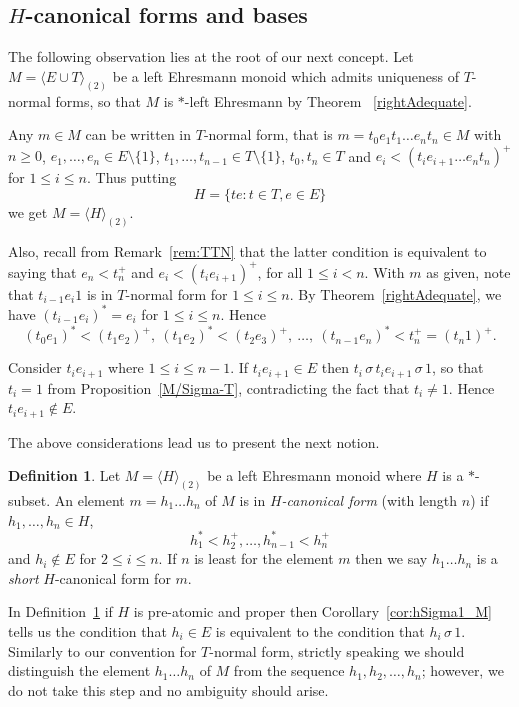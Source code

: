 \documentclass[12pt]{amsart}
\theoremstyle{definition}
\newtheorem{defn}[them]{Definition}
\theoremstyle{definition}
\numberwithin{them}{section}
\numberwithin{equation}{section}
\begin{document}
\subsection{$H$-canonical forms  and bases}\label{sub:h-simple}
The following observation lies at the root of our next concept.
Let $M = \langle E \cup T \rangle_{(2)}$  be a left Ehresmann monoid which admits uniqueness of $T$-normal forms, so that $M$ is $*$-left Ehresmann by Theorem ~\ref{rightAdequate}.
 
 Any $m \in M$ can be written in $T$-normal form, that is $m=t_0e_1t_1\dots e_nt_n\in M$ with $n \geq 0$, $e_1, \dots, e_n \in E\setminus \{1\}$, $t_1, \dots, t_{n-1} \in T\setminus \{1\}$, $t_0, t_n \in T$ and $e_i<(t_ie_{i+1}\dots e_nt_n)^{+}$ for $1 \leq i \leq n$. Thus putting
\[H=\{te: t \in T, e \in E\}\]
we get $M=\langle H\rangle_{(2)}$.

Also, recall from Remark~\ref{rem:TTN} that the latter condition is equivalent to saying that $e_n<t_n^+$ and   $e_i < (t_ie_{i+1})^+$, for all $1 \leq i < n$. With $m$ as given, note that  $t_{i-1}e_i1$ is in   $T$-normal form for $1\leq i\leq n$. By Theorem~\ref{rightAdequate}, we have
$(t_{i-1}e_i)^* = e_i$ for $1\leq i\leq n$.
Hence 
\[(t_0e_1)^* < (t_1e_2)^+,\ (t_1e_2)^* < (t_2e_3)^+,\ \dots,\ (t_{n-1}e_n)^* < t_n^+ = (t_n1)^+.\]

 Consider $t_ie_{i+1}$ where $1 \leq i \leq n-1$. If $t_ie_{i+1}\in E$ then $t_i\,\sigma \, t_ie_{i+1}\, \sigma\,  1$, so that $t_i=1$ from Proposition~\ref {M/Sigma-T}, contradicting the fact that $t_i\neq 1$. Hence $t_ie_{i+1}\notin E$.


The above considerations lead us to present the  next notion.



\begin{defn}\label{defn:hnormal}  Let $M=\langle H\rangle_{(2)}$  be a left Ehresmann monoid  where  $H$ is a $*$-subset.
 An element $m = h_1\dots h_n$  of $M$ is in {\em $H$-canonical form} (with length $n$) if $h_1, \dots, h_n \in H$,  
\[h_1^{\ast} < h^{+}_2, \dots, h^{\ast}_{n-1} < h^{+}_n\]
and  $h_i\notin E$ for  $2 \leq i \leq n$. 
 If $n$ is least for the element $m$  then we say $ h_1\dots h_n$ is a {\em short} $H$-canonical form for $m$.
\end{defn}

In Definition~\ref{defn:hnormal}  if $H$ is 
 pre-atomic  and proper then  Corollary~\ref{cor:hSigma1_M} tells us the condition that  $h_i\in E$ is equivalent to the condition that $h_i\,\sigma\, 1$. 
Similarly to our convention for $T$-normal form, strictly speaking  we should distinguish the element $h_1\dots h_n$ of $M$ from the sequence $h_1,h_2,\dots,h_n$; however, we do not take this step and no ambiguity should arise. 
\end{document}
